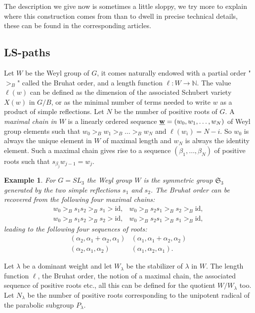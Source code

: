 \documentclass{emsprocart}
\newtheorem{exam}[theorem]{Example}
\theoremstyle{definition}
\begin{document}
The description we give now is sometimes a little sloppy, we try more to explain where this construction comes from than
to dwell in precise technical details, these can be found in the corresponding articles.

\subsection{LS-paths}  Let $W$ be the Weyl group of $G$, it comes naturally endowed with a partial order "$>_B$" called the Bruhat order,
and a length function $\ell:W\rightarrow\mathbb N$. The value $\ell(w)$ can be defined as the dimension of the
associated Schubert variety $X(w)$  in $G/B$, or as the minimal number of terms needed to write $w$ as a product of
simple reflections. Let $N$  be the number of positive roots of $G$.
A {\it maximal chain in $W$} is a linearly ordered sequence $\underline{\bf w}=(w_0,w_1,\ldots,w_N)$  of Weyl group elements such that
$w_0>_Bw_1>_B\ldots>_Bw_N$ and $\ell(w_i)=N-i$. So $w_0$ is always the unique element in $W$ of maximal length and $w_N$ is always the identity element.
Such a maximal chain gives rise to a sequence $(\beta_1,\ldots,\beta_N)$  of positive roots such that $s_{\beta_j}w_{j-1}=w_j$.

\par\noindent
\begin{exam}\rm
For $G=SL_3$ the Weyl group $W$ is the symmetric group $\mathfrak S_{3}$ generated by the two simple reflections $s_1$ and $s_2$.
The Bruhat order can be recovered from the following four maximal chains:
$$
\begin{array}{ccc}
w_0>_Bs_1s_2 >_Bs_1>\text{id}, & w_0>_Bs_2s_1>_Bs_2>_B\text{id},\\
w_0>_Bs_1s_2>_Bs_2>\text{id}, &w_0>_Bs_2s_1 >_Bs_1>_B\text{id},
\end{array}
$$
leading to the following four sequences of roots:
$$
\begin{array}{ccc}
(\alpha_2, \alpha_1+\alpha_2, \alpha_1)&(\alpha_1, \alpha_1+\alpha_2, \alpha_2) \\
( \alpha_2, \alpha_1,  \alpha_2) & (\alpha_1, \alpha_2, \alpha_1).
\end{array}
$$
\end{exam}
Let $\lambda$ be a dominant weight and let $W_\lambda$ be the stabilizer of $\lambda$ in $W$. The
length function $\ell$, the Bruhat order, the notion of a maximal chain, the associated sequence of positive roots etc.,
all this can be defined for the quotient $W/W_\lambda$ too.
Let $N_\lambda$ be the number of positive roots corresponding to the unipotent radical of the parabolic subgroup $P_\lambda$.
\end{document}
